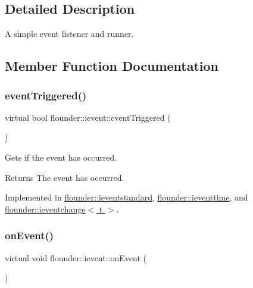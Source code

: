 \subsection{Detailed Description}
A simple event listener and runner. 



\subsection{Member Function Documentation}
\mbox{\label{classflounder_1_1ievent_a4462f66feef99ef4e3521c00f4edd0c9}} 
\subsubsection{\texorpdfstring{event\+Triggered()}{eventTriggered()}}
{\footnotesize\ttfamily virtual bool flounder\+::ievent\+::event\+Triggered (\begin{DoxyParamCaption}{ }\end{DoxyParamCaption})\hspace{0.3cm}{\ttfamily [pure virtual]}}



Gets if the event has occurred. 

\begin{DoxyReturn}{Returns}
The event has occurred. 
\end{DoxyReturn}


Implemented in \hyperlink{classflounder_1_1ieventstandard_a7586cc333f29136b135f92685dc6f91b}{flounder\+::ieventstandard}, \hyperlink{classflounder_1_1ieventtime_a471aad4d2412507875077747ea9ea7a6}{flounder\+::ieventtime}, and \hyperlink{classflounder_1_1ieventchange_a0119e298c97f8457db4024523c97c429}{flounder\+::ieventchange$<$ t $>$}.

\mbox{\label{classflounder_1_1ievent_a6c6abe67435870b25eccd57a251a8992}} 
\subsubsection{\texorpdfstring{on\+Event()}{onEvent()}}
{\footnotesize\ttfamily virtual void flounder\+::ievent\+::on\+Event (\begin{DoxyParamCaption}{ }\end{DoxyParamCaption})\hspace{0.3cm}{\ttfamily [pure virtual]}}




